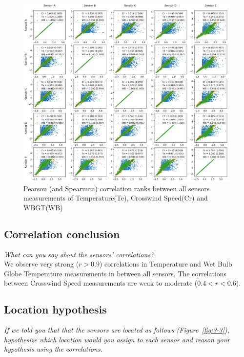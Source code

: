 \documentclass{article}
\begin{document}
\begin{figure}[!htb]
\centering
\includegraphics[width=\textwidth]{3-1-scatter.png}
\caption{Pearson (and Spearman) correlation ranks between all sensors measurements of Temperature(Te), Crosswind Speed(Cr) and WBGT(WB)}
\label{fig:3-1}
\end{figure}

\newpage

\subsection{Correlation conclusion}
\textit{
What can you say about the sensors’ correlations?
}\\

We observe very strong (\(r>0.9\)) correlations in Temperature and Wet Bulb Globe Temperature measurements in between all sensors.
The correlations between Crosswind Speed measurements are weak to moderate (\(0.4<r<0.6\)).


\subsection{Location hypothesis}
\textit{
If we told you that that the sensors are located as follows (Figure~\ref{fig:3-3}), hypothesize which location would you assign to each sensor and reason your hypothesis using the correlations.
}\\
\end{document}
